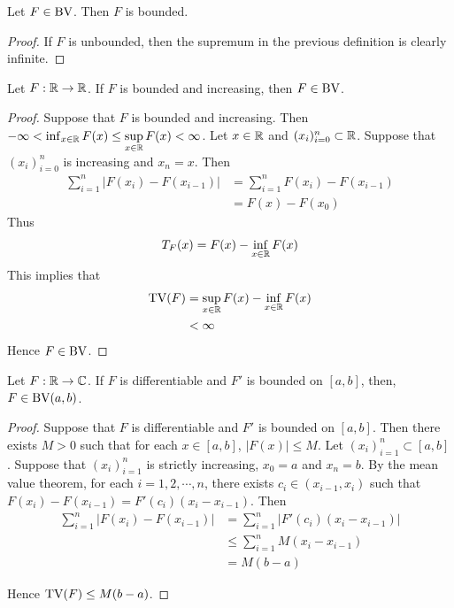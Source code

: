 \documentclass{book}
\begin{document}
	\begin{ex}  
		Let $F \in \text{BV}$. Then $F$ is bounded.
	\end{ex}
	
	\begin{proof}
		If $F$ is unbounded, then the supremum in the previous definition is clearly infinite.
	\end{proof}
	
	\begin{ex}  
		Let $F:\mathbb{R} \rightarrow \mathbb{R}$. If $F$ is bounded and increasing, then $F \in \text{BV}$.
	\end{ex}
	
	\begin{proof}
		Suppose that $F$ is bounded and increasing. Then $-\infty<\inf_{x \in \mathbb{R}}F(x) \leq \sup\limits_{x \in \mathbb{R}}F(x)<\infty$. Let $x \in \mathbb{R}$ and $(x_i)_{i=0}^n \subset \mathbb{R}$. Suppose that $(x_i)_{i=0}^n$ is increasing and $x_n=x$. Then 
		\begin{align*}
			\sum\limits_{i=1}^n|F(x_i)-F(x_{i-1})| 
			&= \sum\limits_{i=1}^n F(x_i)-F(x_{i-1})\\
			&= F(x)-F(x_0)
		\end{align*}
		Thus 
		$$T_F(x) = F(x)-\inf_{x \in \mathbb{R}}F(x)$$ 
		This implies that 
		\begin{align*}
			\text{TV}(F) 
			&= \sup\limits_{x \in \mathbb{R}}F(x)-\inf_{x \in \mathbb{R}}F(x)\\
			&<\infty
		\end{align*}
		Hence $F \in \text{BV}$.
	\end{proof}
	
	\begin{ex}  
		Let $F:\mathbb{R} \rightarrow \mathbb{C}$. If $F$ is differentiable and $F'$ is bounded on $[a,b]$, then, $F \in \text{BV}(a,b)$. 
	\end{ex}
	
	\begin{proof}
		Suppose that $F$ is differentiable and $F'$ is bounded on $[a,b]$. Then there exists $M>0$ such that for each $x \in [a,b]$, $|F(x)| \leq M$. Let $(x_i)_{i=1}^n \subset [a,b]$. Suppose that $(x_i)_{i=1}^n$ is strictly increasing, $x_0=a$ and $x_n=b$. By the mean value theorem, for each $i =1,2, \cdots, n$, there exists $c_i\in (x_{i-1}, x_i)$ such that $F(x_i)-F(x_{i-1})=F'(c_i)(x_i-x_{i-1})$. Then 
		\begin{align*}
			\sum\limits_{i=1}^n|F(x_i)-F(x_{i-1})|
			&= \sum\limits_{i=1}^n|F'(c_i)(x_i-x_{i-1})|\\
			&\leq  \sum\limits_{i=1}^nM(x_i-x_{i-1})\\
			&=M(b-a)
		\end{align*}
		
		Hence $\text{TV}(F) \leq M(b-a)$.
	\end{proof}
	
\end{document}
